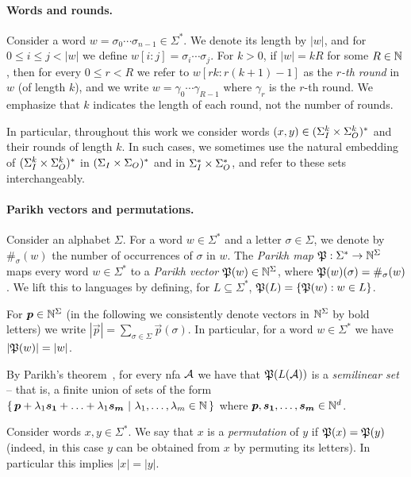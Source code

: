 
\paragraph*{Words and rounds.}
Consider a word $w=\sigma_0\cdots \sigma_{n-1}\in \Sigma^*$. We denote its length by $|w|$, and for $0\le i\le j< |w|$ we define $w[i:j]=\sigma_i\cdots \sigma_j$. 
For $k>0$, if $|w|=kR$ for some $R\in \mathbb{N}$, then for every $0\le r<R$ we refer to $w[rk:r(k+1)-1]$ as the \emph{$r$-th round} in $w$ (of length $k$), and we write $w=\gamma_0\cdots \gamma_{R-1}$ where $\gamma_r$ is the $r$-th round. We emphasize that $k$ indicates the length of each round, not the number of rounds.

In particular, throughout this work we consider words $(x,y)\in (\Sigma_{I}^k\times \Sigma_{O}^k)^*$ and their rounds of length $k$. In such cases, we sometimes use the natural embedding of $(\Sigma_{I}^k\times \Sigma_{O}^k)^*$ in $(\Sigma_{I}\times \Sigma_{O})^*$ and in $\Sigma_{I}^*\times \Sigma_{O}^*$, and refer to these sets interchangeably.

\paragraph*{Parikh vectors and permutations.}
Consider an alphabet $\Sigma$. For a word $w\in \Sigma^*$ and a letter $\sigma\in \Sigma$, we denote by $\#_\sigma(w)$ the number of occurrences of $\sigma$ in $w$. 
The \emph{Parikh map}
$\mathfrak{P}:\Sigma^*\to \mathbb{N}^\Sigma$ maps every word $w\in \Sigma^*$ to a \emph{Parikh vector} $\mathfrak{P}(w)\in \mathbb{N}^\Sigma$, where $\mathfrak{P}(w)(\sigma)=\#_\sigma(w)$. We lift this to languages by defining, for $L\subseteq \Sigma^*$, $\mathfrak{P}(L)=\{\mathfrak{P}(w):w\in L\}$.

For $\boldsymbol{p}\in \mathbb{N}^\Sigma$ (in the following we consistently denote vectors in $\mathbb{N}^\Sigma$ by bold letters) we write $|\vec{p}|=\sum_{\sigma\in \Sigma}\vec{p}(\sigma)$. In particular, for a word $w\in \Sigma^*$ we have $|\mathfrak{P}(w)|=|w|$.

By Parikh's theorem~\cite{Parikh1966}, for every \gls{nfa} $\mathcal{A}$ we have that $\mathfrak{P}(L(\mathcal{A}))$ is a \emph{semilinear set} -- that is, a finite union of sets of the form
$\left\{\,\boldsymbol{p}+\lambda_1 \boldsymbol{s_1}+\ldots+\lambda_1 \boldsymbol{s_m}\ \middle|\ \lambda_1,\ldots,\lambda_m\in \mathbb{N}\,\right\}$
where $\boldsymbol{p},\boldsymbol{s_1},\ldots,\boldsymbol{s_m}\in \mathbb{N}^d$.

Consider words $x,y\in \Sigma^*$. We say that $x$ is a \emph{permutation} of $y$ if $\mathfrak{P}(x)=\mathfrak{P}(y)$ (indeed, in this case $y$ can be obtained from $x$ by permuting its letters). In particular this implies $|x|=|y|$.
